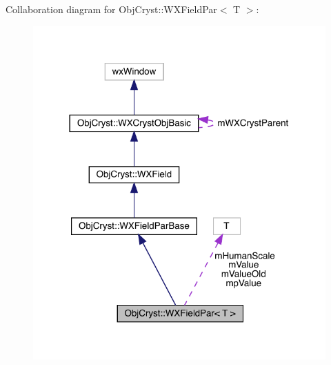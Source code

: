 Collaboration diagram for Obj\+Cryst\+::W\+X\+Field\+Par$<$ T $>$\+:
\nopagebreak
\begin{figure}[H]
\begin{center}
\leavevmode
\includegraphics[width=318pt]{class_obj_cryst_1_1_w_x_field_par__coll__graph}
\end{center}
\end{figure}
